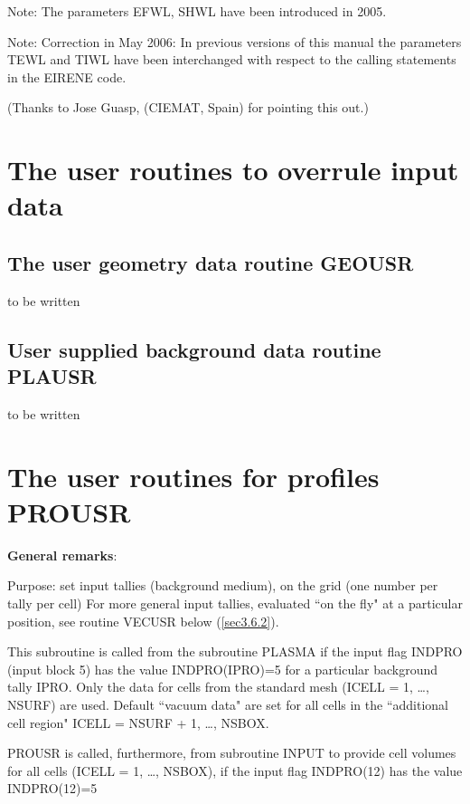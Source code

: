 Note: The parameters EFWL, SHWL have been introduced in 2005.

Note: Correction in May 2006: In previous versions of this manual the
parameters TEWL and TIWL have been interchanged with respect to the calling
statements in the EIRENE code.

(Thanks to Jose Guasp, (CIEMAT, Spain) for pointing this out.)

\newpage

\section{The user routines to overrule input data}
\label{sec3.5}

\subsection{The user geometry data routine GEOUSR} \label{sec3.5.1}

to be written

\newpage

\subsection{User supplied background data routine PLAUSR}
\label{sec3.5.2}

to be written

\section{The user routines for profiles PROUSR}
\label{sec3.6}

\medskip

\textbf{General remarks}:

\medskip

Purpose: set input tallies (background medium), on the grid (one number per
tally per cell) For more general input tallies, evaluated ``on the fly" at a
particular position, see routine VECUSR below (\cref{sec3.6.2}).

This subroutine is called from the subroutine PLASMA if the input flag INDPRO
(input block 5) has the value INDPRO(IPRO)=5 for a particular background tally
IPRO.
Only the data for cells from the standard mesh (ICELL = 1, \dots, NSURF) are
used.
Default ``vacuum data" are set for all cells in the ``additional cell region"
ICELL = NSURF + 1, \dots, NSBOX.

PROUSR is called, furthermore, from subroutine INPUT to provide cell volumes
for all cells (ICELL = 1, \dots, NSBOX), if the input flag INDPRO(12) has the
value INDPRO(12)=5 

